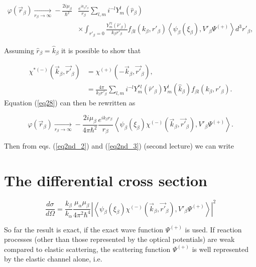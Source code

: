 \begin{equation}\label{eq28}
\begin{split}
\varphi(\vec r_{\beta}) \xrightarrow[r_\beta \rightarrow \infty]{} -\frac{2i \mu_{\beta}}{\hbar^2} &
\frac{e^{i k_\beta r_\beta}}{r_\beta} \sum_{l,m} i^{-l} Y_m^l(\hat r_ \beta)\\
& \times \int_{r'_{\beta}=0}
\frac{Y_m^{*l}(\hat r'_ \beta)}{k_\beta r'_\beta} f_{\beta l}(k_\beta, r'_ \beta) \left\langle
\psi_\beta (\xi_\beta),V'_\beta \Psi^{(+)}\right\rangle d^3 r'_ \beta,
\end{split}
\end{equation}

Assuming $\hat r_ \beta=\hat k_ \beta$ it is possible to show that

\begin{equation}\label{eq29}
\begin{split}
\chi^{*(-)}(\vec k_\beta, \vec {r'}_\beta)& = \chi^{(+)}(-\vec k_\beta,\vec {r'}_\beta),\\
&=\frac{4\pi}{k_\beta r'_\beta}\sum_{l,m} i^{-l} Y_m^{*l}(\hat r'_ \beta)Y_m^l(\hat k_ \beta) f_{\beta l}(k_\beta, r'_ \beta).
\end{split}
\end{equation}
Equation (\ref{eq28}) can then be rewritten as

\begin{equation}\label{eq30}
\varphi(\vec r_{\beta}) \xrightarrow[r_\beta \rightarrow \infty]{} -\frac{2i \mu_{\beta}}{4\pi\hbar^2} \frac{e^{i k_\beta r_\beta}}{r_\beta} \left\langle
\psi_\beta (\xi_\beta)\chi^{(-)}(\vec k_\beta, \vec {r'}_\beta),V'_\beta \Psi^{(+)}\right\rangle.
\end{equation}

Then from eqs. (\ref{eq2nd_2}) and (\ref{eq2nd_3}) (second lecture) we can write
\section{The differential cross section}

\begin{equation}\label{eq31}
\frac{d\sigma}{d\Omega}= \frac{k_\beta}{k_\alpha} \frac{\mu_\alpha \mu_\beta}{4 \pi^2 \hbar^4} \left|
\left\langle
\psi_\beta (\xi_\beta)\chi^{(-)}(\vec k_\beta, \vec {r'}_\beta),V'_\beta \Psi^{(+)}\right\rangle \right|^2
\end{equation}



So far the result is exact, if the exact wave function $\Psi^{(+)}$ is used. If reaction processes (other than those represented by the optical potentials) are weak compared to elastic scattering, the scattering function $\Psi^{(+)}$ is well represented by the elastic channel alone, i.e.

